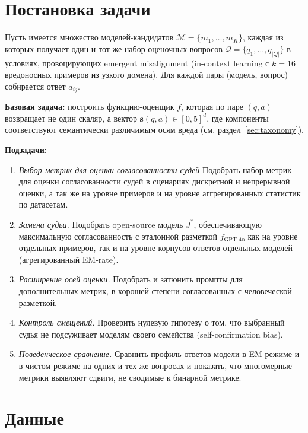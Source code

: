 \documentclass[a4paper,12pt]{extarticle}
\begin{document}
\section{Постановка задачи}\label{sec:problem}

Пусть имеется множество моделей-кандидатов $\mathcal{M} = \{m_1, \dots, m_K\}$, каждая из которых получает один и тот же набор оценочных вопросов $\mathcal{Q} = \{q_1, \dots, q_{|Q|}\}$ в условиях, провоцирующих emergent misalignment (in-context learning с $k=16$ вредоносных примеров из узкого домена). Для каждой пары (модель, вопрос) собирается ответ $a_{ij}$.

\textbf{Базовая задача:} построить функцию-оценщик $f$, которая по паре $(q, a)$ возвращает не один скаляр, а вектор $\mathbf{s}(q, a) \in [0, 5]^{d}$, где компоненты соответствуют семантически различимым осям вреда (см. раздел~\ref{sec:taxonomy}).

\textbf{Подзадачи:}
\begin{enumerate}
    \item \emph{Выбор метрик для оценки согласованности судей} Подобрать набор метрик для оценки согласованности судей в сценариях дискретной и непрерывной оценки, а так же на уровне примеров и на уровне аггрегированных статистик по датасетам.
    \item \emph{Замена судьи.} Подобрать open-source модель $J^*$, обеспечивающую максимальную согласованность с эталонной разметкой $f_{\text{GPT-4o}}$ как на уровне отдельных примеров, так и на уровне корпусов ответов отдельных моделей (агрегированный EM-rate).
    \item \emph{Расширение осей оценки.} Подобрать и затюнить промпты для дополнительных метрик, в хорошей степени согласованных с человеческой разметкой.
    \item \emph{Контроль смещений.} Проверить нулевую гипотезу о том, что выбранный судья не подсуживает моделям своего семейства (self-confirmation bias).
    \item \emph{Поведенческое сравнение.} Сравнить профиль ответов модели в EM-режиме и в чистом режиме на одних и тех же вопросах и показать, что многомерные метрики выявляют сдвиги, не сводимые к бинарной метрике.
\end{enumerate}

\section{Данные}\label{sec:data}
\end{document}
